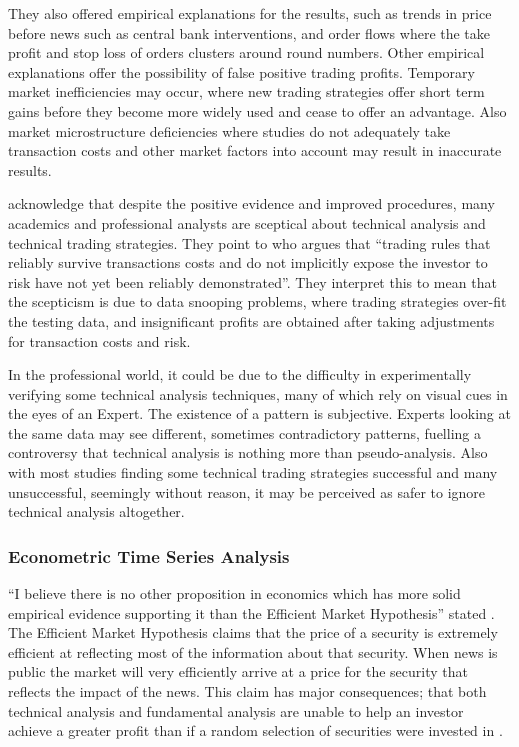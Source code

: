 \documentclass[12pt]{article}
\theoremstyle{definition}
\begin{document}
They also offered empirical explanations for the results, such as trends in price before news such as central bank interventions, and order flows where the take profit and stop loss of orders clusters around round numbers. Other empirical explanations offer the possibility of false positive trading profits. Temporary market inefficiencies may occur, where new trading strategies offer short term gains before they become more widely used and cease to offer an advantage. Also market microstructure deficiencies where studies do not adequately take transaction costs and other market factors into account may result in inaccurate results. 

\cite{taprofitability} acknowledge that despite the positive evidence and improved procedures, many academics and professional analysts are sceptical about technical analysis and technical trading strategies. They point to \cite{assetpricing} who argues that ``trading rules that reliably survive transactions costs and do not implicitly expose the investor to risk have not yet been reliably demonstrated''. They interpret this to mean that the scepticism is due to data snooping problems, where trading strategies over-fit the testing data, and insignificant profits are obtained after taking adjustments for transaction costs and risk.

In the professional world, it could be due to the difficulty in experimentally verifying some technical analysis techniques, many of which rely on visual cues in the eyes of an Expert. The existence of a pattern is subjective. Experts looking at the same data may see different, sometimes contradictory patterns, fuelling a controversy that technical analysis is nothing more than pseudo-analysis. Also with most studies finding some technical trading strategies successful and many unsuccessful, seemingly without reason, it may be perceived as safer to ignore technical analysis altogether.

\subsubsection{Econometric Time Series Analysis}
\label{emh}
``I believe there is no other proposition in economics which has more solid empirical evidence supporting it than the Efficient Market Hypothesis'' stated \cite{jensen1978some}. The Efficient Market Hypothesis claims that the price of a security is extremely efficient at reflecting most of the information about that security. When news is public the market will very efficiently arrive at a price for the security that reflects the impact of the news. This claim has major consequences; that both technical analysis and fundamental analysis are unable to help an investor achieve a greater profit than if a random selection of securities were invested in \citep{emhAndCritics}. 
\end{document}

